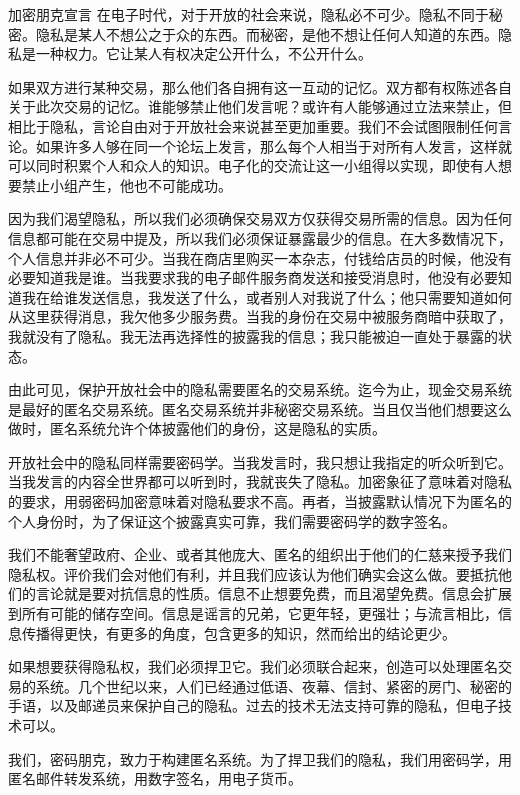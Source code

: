 \documentclass[11pt]{beamer}
\begin{document}
\begin{frame}[allowframebreaks]{加密朋克宣言}
	\footnotesize
	在电子时代，对于开放的社会来说，隐私必不可少。隐私不同于秘密。隐私是某人不想公之于众的东西。而秘密，是他不想让任何人知道的东西。{\color{red}隐私是一种权力}。它让某人有权决定公开什么，不公开什么。
	
	如果双方进行某种交易，那么他们各自拥有这一互动的记忆。双方都有权陈述各自关于此次交易的记忆。谁能够禁止他们发言呢？或许有人能够通过立法来禁止，但相比于隐私，言论自由对于开放社会来说甚至更加重要。我们不会试图限制任何言论。如果许多人够在同一个论坛上发言，那么每个人相当于对所有人发言，这样就可以同时积累个人和众人的知识。电子化的交流让这一小组得以实现，即使有人想要禁止小组产生，他也不可能成功。
	
	因为我们渴望隐私，所以我们必须确保交易双方仅获得交易所需的信息。因为任何信息都可能在交易中提及，所以我们必须保证暴露最少的信息。在大多数情况下，个人信息并非必不可少。当我在商店里购买一本杂志，付钱给店员的时候，他没有必要知道我是谁。当我要求我的电子邮件服务商发送和接受消息时，他没有必要知道我在给谁发送信息，我发送了什么，或者别人对我说了什么；他只需要知道如何从这里获得消息，我欠他多少服务费。当我的身份在交易中被服务商暗中获取了，我就没有了隐私。我无法再选择性的披露我的信息；我只能被迫一直处于暴露的状态。
	
	由此可见，{\color{red}保护开放社会中的隐私需要匿名的交易系统}。迄今为止，现金交易系统是最好的匿名交易系统。匿名交易系统并非秘密交易系统。当且仅当他们想要这么做时，匿名系统允许个体披露他们的身份，这是隐私的实质。
	
	开放社会中的隐私同样需要密码学。当我发言时，我只想让我指定的听众听到它。当我发言的内容全世界都可以听到时，我就丧失了隐私。加密象征了意味着对隐私的要求，用弱密码加密意味着对隐私要求不高。再者，当披露默认情况下为匿名的个人身份时，为了保证这个披露真实可靠，我们需要{\color{red}密码学的数字签名}。
	
	我们不能奢望政府、企业、或者其他庞大、匿名的组织出于他们的仁慈来授予我们隐私权。评价我们会对他们有利，并且我们应该认为他们确实会这么做。要抵抗他们的言论就是要对抗信息的性质。信息不止想要免费，而且渴望免费。信息会扩展到所有可能的储存空间。信息是谣言的兄弟，它更年轻，更强壮；与流言相比，信息传播得更快，有更多的角度，包含更多的知识，然而给出的结论更少。
	
	如果想要获得隐私权，我们必须捍卫它。{\color{red}我们必须联合起来，创造可以处理匿名交易的系统}。几个世纪以来，人们已经通过低语、夜幕、信封、紧密的房门、秘密的手语，以及邮递员来保护自己的隐私。过去的技术无法支持可靠的隐私，但电子技术可以。
	
	{\color{red}我们，密码朋克，致力于构建匿名系统。为了捍卫我们的隐私，我们用密码学，用匿名邮件转发系统，用数字签名，用电子货币}。
	

\end{frame}
\end{document}

